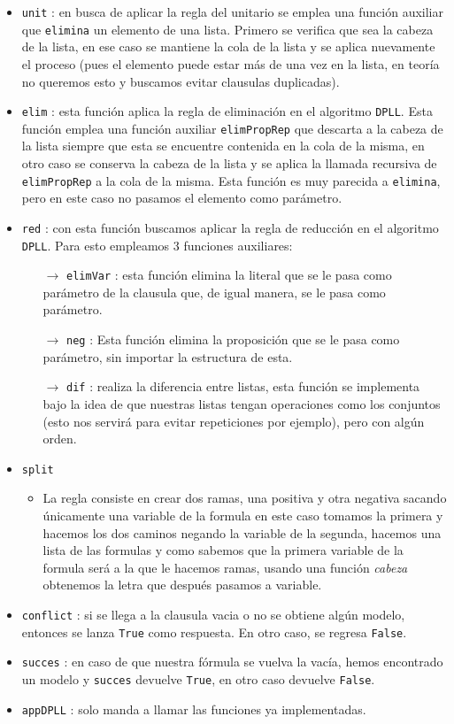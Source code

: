 \documentclass{article}
\newcommand{\code}[1]{\textcolor{white!25!black}{\texttt{#1}}}
\begin{document}
\begin{itemize}
\item \code{unit} : en busca de aplicar la regla del unitario se emplea una función auxiliar que
  \code{elimina} un elemento de una lista. Primero se verifica que sea la cabeza de la lista, en
  ese caso se mantiene la cola de la lista y se aplica nuevamente el proceso (pues el elemento
  puede estar más de una vez en la lista, en teoría no queremos esto y buscamos evitar clausulas
  duplicadas).
\item \code{elim} : esta función aplica la regla de eliminación en el algoritmo \code{DPLL}. Esta
  función emplea una función auxiliar \code{elimPropRep} que descarta a la cabeza de la lista siempre
  que esta se encuentre contenida en la cola de la misma, en otro caso se conserva la cabeza de la
  lista y se aplica la llamada recursiva de \code{elimPropRep} a la cola de la misma. Esta función
  es muy parecida a \code{elimina}, pero en este caso no pasamos el elemento como parámetro.
\item \code{red} : con esta función buscamos aplicar la regla de reducción en el algoritmo \code{DPLL}.
  Para esto empleamos $3$ funciones auxiliares:
  \begin{itemize}
  \item[$\rightarrow$] \code{elimVar} : esta función elimina la literal que se le pasa como parámetro
    de la clausula que, de igual manera, se le pasa como parámetro.
  \item[$\rightarrow$] \code{neg} : Esta función elimina la proposición que se le pasa como parámetro,
    sin importar la estructura de esta.
  \item[$\rightarrow$] \code{dif} : realiza la diferencia entre listas, esta función se implementa bajo
    la idea de que nuestras listas tengan operaciones como los conjuntos (esto nos servirá para evitar
    repeticiones por ejemplo), pero con algún orden.
  \end{itemize}
\item \code{split}
  \begin{itemize}
  \item La regla consiste en crear dos ramas, una positiva y otra negativa sacando únicamente una variable de la formula en este caso tomamos la primera y hacemos los dos caminos negando la variable de la segunda, hacemos una lista de las formulas y como sabemos que la primera variable de la formula será a la que le hacemos ramas, usando una función \textit{cabeza} obtenemos la letra que después pasamos a variable.  
  \end{itemize}
\item \code{conflict} : si se llega a la clausula vacia o no se obtiene algún modelo, entonces se lanza
  \code{True} como respuesta. En otro caso, se regresa \code{False}.
\item \code{succes} : en caso de que nuestra fórmula se vuelva la vacía, hemos encontrado un modelo y
  \code{succes} devuelve \code{True}, en otro caso devuelve \code{False}.
\item \code{appDPLL} : solo manda a llamar las funciones ya implementadas.
\end{itemize}
\end{document}

